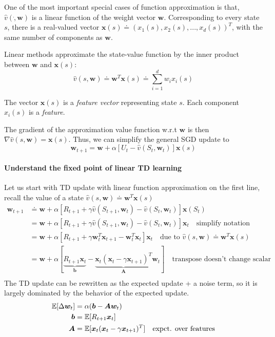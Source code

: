 \documentclass[sutton_barto_notes.tex]{subfiles}
\begin{document}
One of the most important special cases of function approximation is that, $\hat{v}(\dot, \bm{w})$ is a linear function of the weight vector $\bm{w}$. Corresponding to every state $s$, there is a real-valued vector $\bm{x}(s)\doteq (x_1(s),x_2(s),...,x_d(s))^T$, with the same number of components as $\bm{w}$.

Linear methods approximate the state-value function by the inner product between $\bm{w}$ and $\bm{x}(s)$:
$$\hat{v}(s,\bm{w}) \doteq \bm{w}^T\bm{x}(s)\doteq \sum_{i=1}^d w_i x_i(s) $$

The vector $\bm{x}(s)$ is a \textit{feature vector} representing state $s$. Each component $x_i(s)$ is a \textit{feature}.

The gradient of the approximation value function w.r.t $\bm{w}$ is then $\nabla\hat{v}(s,\bm{w})=\bm{x}(s)$.
Thus, we can simplify the general SGD update to
$$\bm{w}_{t+1} = \bm{w} + \alpha[U_t - \hat{v}(S_t, \bm{w}_t)]\bm{x}(s)$$

\paragraph{Understand the fixed point of linear TD learning}

Let us start with TD update with linear function approximation on the first line, recall the value of a state $\hat{v}(s,\bm{w}) \doteq \bm{w}^T\bm{x}(s)$
\begin{align*}
\bm{w}_{t+1} &\doteq \bm{w} + \alpha[R_{t+1} + \gamma\hat{v}(S_{t+1},\bm{w}_t) - \hat{v}(S_t, \bm{w}_t)]\bm{x}(S_t) \\
&= \bm{w} + \alpha[R_{t+1} + \gamma\hat{v}(S_{t+1},\bm{w}_t) - \hat{v}(S_t, \bm{w}_t)]\bm{x}_t \quad \text{simplify notation}\\
&= \bm{w} + \alpha[R_{t+1} + \gamma\bm{w}_t^T\bm{x}_{t+1} - \bm{w}_t^T\bm{x}_t]\bm{x}_t \quad \text{due to }\hat{v}(s,\bm{w}) \doteq \bm{w}^T\bm{x}(s)\\
&= \bm{w} + \alpha[\underbrace{R_{t+1}\bm{x}_t}_{\bm{b}} - \underbrace{\bm{x}_t(\bm{x}_t - \gamma\bm{x}_{t+1})^T}_{\bm{A}}\bm{w}_t] \quad\text{transpose doesn't change scalar}\\
\end{align*}
The TD update can be rewritten as the expected update + a noise term, so it is largely dominated by the behavior of the expected update.
\begin{align*}
\operatorname*{\mathbb{E}}[\Delta \bm{w}_t] &= \alpha(\bm{b} - \bm{A}\bm{w}_t) \\
\bm{b} &= \operatorname*{\mathbb{E}}[R_{t+1}\bm{x}_t] \\
\bm{A} &= \operatorname*{\mathbb{E}}[\bm{x}_t(\bm{x}_t - \gamma\bm{x}_{t+1})^T] \quad \text{expct. over features}
\end{align*}
\end{document}
